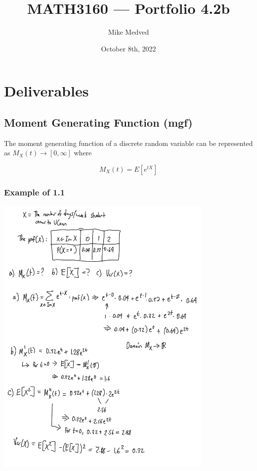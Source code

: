 \documentclass{article}
\title{MATH3160 — Portfolio 4.2b}
\author{Mike Medved}
\date{October 8th, 2022}
\begin{document}
\maketitle

\section{Deliverables}

\subsection{Moment Generating Function (mgf)}

The moment generating function of a discrete random variable can be represented as $M_X(t) \to \left[0, \infty\right]$ where

$$
M_X(t) = E\left[e^{tX}\right]
$$

\subsubsection{Example of 1.1}

\includegraphics[height=5.5in]{example-mgf.jpeg}
\end{document}
